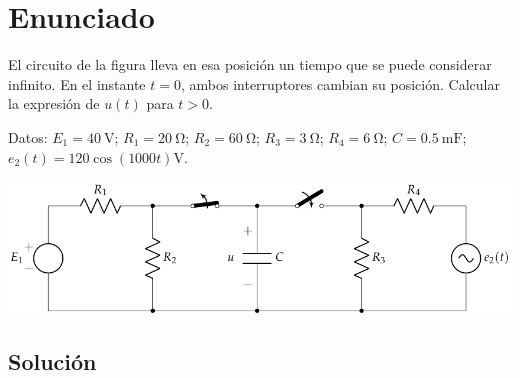 \section{Enunciado}
El circuito de la figura lleva en esa posición un tiempo que se puede considerar infinito. En el instante $t=0$, ambos interruptores cambian su posición. Calcular la expresión de $u(t)$ para $t>0$.

Datos: $E_1 = \qty{40}{\volt}$; $R_1 = \qty{20}{\ohm}$; $R_2 = \qty{60}{\ohm}$; $R_3 = \qty{3}{\ohm}$; $R_4 = \qty{6}{\ohm}$; $C = \qty{0.5}{\milli\farad}$; $e_2(t) = 120 \cos(1000t)\unit{\volt}$.

\begin{center}
  \includegraphics{figuras/BT4_04.pdf}
\end{center}

\subsection*{Solución}

